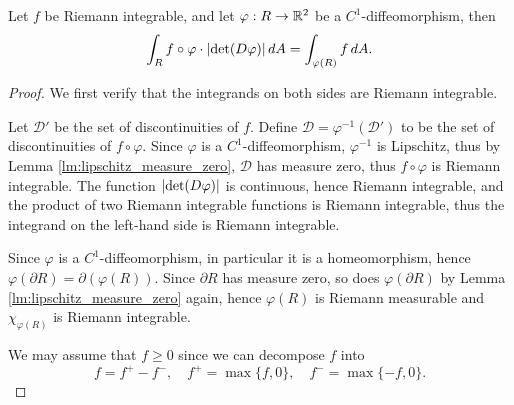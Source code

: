 \begin{thm}
    Let $f$ be Riemann integrable, and let $\varphi: R \to {\mathbb R}^2$ be a $C^1$-diffeomorphism, then
    \[
    \int_R f \circ \varphi \cdot {\left| \det (D\varphi) \right|} \, dA = \int_{\varphi(R)} f \, dA.
    \]
    \begin{proof}
        We first verify that the integrands on both sides are Riemann integrable. 
        
        Let $\mathcal D'$ be the set of discontinuities of $f$. Define $\mathcal D = \varphi^{-1}(\mathcal D')$ to be the set of discontinuities of $f \circ \varphi$. Since $\varphi$ is a $C^1$-diffeomorphism, $\varphi^{-1}$ is Lipschitz, thus by Lemma \ref{lm:lipschitz_measure_zero}, $\mathcal D$ has measure zero, thus $f \circ \varphi$ is Riemann integrable. The function ${\left| \det (D\varphi) \right|}$ is continuous, hence Riemann integrable, and the product of two Riemann integrable functions is Riemann integrable, thus the integrand on the left-hand side is Riemann integrable.

        Since $\varphi$ is a $C^1$-diffeomorphism, in particular it is a homeomorphism, hence $\varphi(\partial R) = \partial (\varphi(R))$. Since $\partial R$ has measure zero, so does $\varphi(\partial R)$ by Lemma \ref{lm:lipschitz_measure_zero} again, hence $\varphi(R)$ is Riemann measurable and $\chi_{\varphi(R)}$ is Riemann integrable. 

        We may assume that $f \geq 0$ since we can decompose $f$ into
        \[
        f = f^+ - f^-, \quad f^+ = \max\{f, 0\}, \quad f^- = \max\{-f, 0\}.
        \]


\end{proof}
\end{thm}
